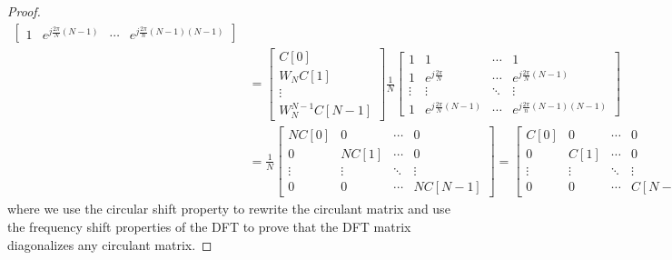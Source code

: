 \documentclass{article}
\begin{document}
\begin{proof}
\begin{align}
\begin{bmatrix}
            1 & e^{j \frac{2\pi}{N} (N - 1)} & \cdots & e^{j \frac{2\pi}{n} (N - 1) (N - 1)}
        \end{bmatrix} \\
        &=
        \begin{bmatrix}
            C[0] \\
            W_N C[1] \\
            \vdots \\
            W_N^{N - 1} C[N - 1]
        \end{bmatrix}
        \frac{1}{N} \begin{bmatrix}
            1 & 1 & \cdots & 1 \\
            1 & e^{j \frac{2\pi}{N}} & \cdots & e^{j \frac{2\pi}{N} (N - 1)} \\
            \vdots & \vdots & \ddots & \vdots \\
            1 & e^{j \frac{2\pi}{N} (N - 1)} & \cdots & e^{j \frac{2\pi}{n} (N - 1) (N - 1)}
        \end{bmatrix} \\
        &=
        \frac{1}{N} \begin{bmatrix}
            N C[0] & 0 & \cdots & 0 \\
            0 & N C[1] & \cdots & 0 \\
            \vdots & \vdots & \ddots & \vdots \\
            0 & 0 & \cdots & N C[N - 1]
        \end{bmatrix}
        =
        \begin{bmatrix}
            C[0] & 0 & \cdots & 0 \\
            0 & C[1] & \cdots & 0 \\
            \vdots & \vdots & \ddots & \vdots \\
            0 & 0 & \cdots & C[N - 1]
        \end{bmatrix}
    \end{align}
    where we use the circular shift property to rewrite the circulant matrix and use the frequency shift properties of the DFT to prove that the DFT matrix diagonalizes any circulant matrix.
\end{proof}

\end{document}
